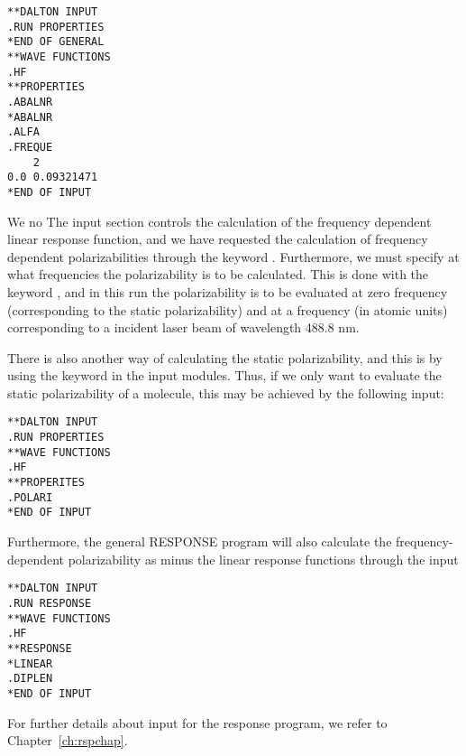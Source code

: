 \begin{verbatim}
**DALTON INPUT
.RUN PROPERTIES
*END OF GENERAL
**WAVE FUNCTIONS
.HF
**PROPERTIES
.ABALNR
*ABALNR
.ALFA
.FREQUE
    2
0.0 0.09321471
*END OF INPUT
\end{verbatim}

We no
The  input section controls the calculation of the
frequency dependent linear response function,
and we have requested 
the calculation of frequency dependent
polarizabilities through 
the keyword . 
Furthermore, we must specify at what frequencies the polarizability is
to be calculated. This is done with the keyword , and in
this run the polarizability is to be evaluated at zero frequency
(corresponding to the static polarizability) and at a frequency (in
atomic units) corresponding to a incident laser beam of wavelength
488.8 nm.

There is also another way of calculating the static
 polarizability, and this is by using the 
keyword  in the  input modules. Thus, if we only
want to evaluate the static polarizability of a molecule, this may be
achieved by the following input:

\begin{verbatim}
**DALTON INPUT
.RUN PROPERTIES
**WAVE FUNCTIONS
.HF
**PROPERITES
.POLARI
*END OF INPUT
\end{verbatim}

Furthermore, the general RESPONSE program will also calculate the
frequency-dependent polarizability as minus the linear response 
functions through the input


\begin{verbatim}
**DALTON INPUT
.RUN RESPONSE
**WAVE FUNCTIONS
.HF
**RESPONSE
*LINEAR
.DIPLEN
*END OF INPUT
\end{verbatim}
For further details about input for the response program, we refer to
Chapter~\ref{ch:rspchap}.
